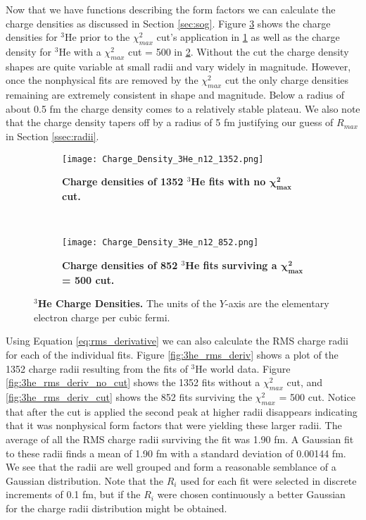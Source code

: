Now that we have functions describing the form factors we can calculate the charge densities as discussed in Section \ref{sec:sog}. Figure \ref{fig:3he_charge_density} shows the charge densities for $^3$He prior to the $\chi^2_{max}$ cut's application in \ref{fig:3he_charge_density_no_cut} as well as the charge density for $^3$He with a $\chi^2_{max}$ cut = 500 in \ref{fig:3he_charge_density_cut}. Without the cut the charge density shapes are quite variable at small radii and vary widely in magnitude. However, once the nonphysical fits are removed by the $\chi^2_{max}$ cut the only charge densities remaining are extremely consistent in shape and magnitude. Below a radius of about 0.5 fm the charge density comes to a relatively stable plateau. We also note that the charge density tapers off by a radius of 5 fm justifying our guess of $R_{max}$ in Section \ref{ssec:radii}. %

\begin{figure}[!ht]
\begin{subfigure}{1.\textwidth}
  \centering
  \texttt{[image: Charge\_Density\_3He\_n12\_1352.png]}
  \caption{\bf{Charge densities of 1352 $^3$He fits with no $\boldsymbol{\chi^2_{max}}$ cut.}}
  \label{fig:3he_charge_density_no_cut}
\end{subfigure}\\
\begin{subfigure}{1.\textwidth}
  \centering
  \texttt{[image: Charge\_Density\_3He\_n12\_852.png]}
  \caption{\bf{Charge densities of 852 $^3$He fits surviving a $\boldsymbol{\chi^2_{max}}$ = 500 cut.}}
  \label{fig:3he_charge_density_cut}
\end{subfigure}
\caption[$^3$He Charge Densities]{{\bf{$^3$He Charge Densities.}} The units of the $Y$-axis are the elementary electron charge per cubic fermi.}
\label{fig:3he_charge_density}
\end{figure}

Using Equation \ref{eq:rms_derivative} we can also calculate the RMS charge radii for each of the individual fits. Figure \ref{fig:3he_rms_deriv} shows a plot of the 1352 charge radii resulting from the fits of $^3$He world data. Figure \ref{fig:3he_rms_deriv_no_cut} shows the 1352 fits without a $\chi^2_{max}$ cut, and \ref{fig:3he_rms_deriv_cut} shows the 852 fits surviving the $\chi^2_{max}$ = 500 cut. Notice that after the cut is applied the second peak at higher radii disappears indicating that it was nonphysical form factors that were yielding these larger radii. The average of all the RMS charge radii surviving the fit was 1.90 fm. A Gaussian fit to these radii finds a mean of 1.90 fm with a standard deviation of 0.00144 fm. We see that the radii are well grouped and form a reasonable semblance of a Gaussian distribution. Note that the $R_i$ used for each fit were selected in discrete increments of 0.1 fm, but if the $R_i$ were chosen continuously a better Gaussian for the charge radii distribution might be obtained. %

